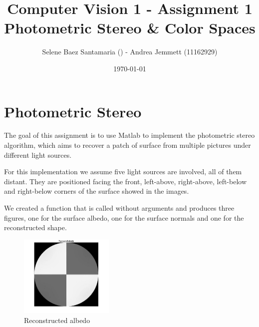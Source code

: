\documentclass[11pt]{article}
\title{
	{Computer Vision 1 - Assignment 1 \\
	Photometric Stereo \& Color Spaces}
}
\author{
Selene Baez Santamaria () - Andrea Jemmett (11162929)}
\date{\today}
\begin{document}
\maketitle


\section{Photometric Stereo}
The goal of this assignment is to use Matlab to implement the photometric stereo algorithm, which aims to recover a patch of surface from multiple pictures under different light sources.

For this implementation we assume five light sources are involved, all of them distant.
They are positioned facing the front, left-above, right-above, left-below and right-below corners of the surface showed in the images.

We created a function that is called without arguments and produces three figures, one for the surface albedo, one for the surface normals and one for the reconstructed shape.

\begin{figure}[!htp]
    \centering
    \includegraphics[width=0.4\textwidth]{albedo.jpg}
    \caption{Reconstructed albedo}
    \label{fig:albedo}
\end{figure}
\end{document}
